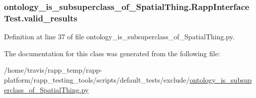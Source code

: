 \hypertarget{classontology__is__subsuperclass__of__SpatialThing_1_1RappInterfaceTest_a6643a11c2835d7d6e72acf58b9ead5f7}{
\subsubsection[{valid\-\_\-results}]{\setlength{\rightskip}{0pt plus 5cm}ontology\-\_\-is\-\_\-subsuperclass\-\_\-of\-\_\-\-Spatial\-Thing.\-Rapp\-Interface\-Test.\-valid\-\_\-results}}\label{classontology__is__subsuperclass__of__SpatialThing_1_1RappInterfaceTest_a6643a11c2835d7d6e72acf58b9ead5f7}


Definition at line 37 of file ontology\-\_\-is\-\_\-subsuperclass\-\_\-of\-\_\-\-Spatial\-Thing.\-py.



The documentation for this class was generated from the following file\-:\begin{DoxyCompactItemize}
\item 
/home/travis/rapp\-\_\-temp/rapp-\/platform/rapp\-\_\-testing\-\_\-tools/scripts/default\-\_\-tests/exclude/\hyperlink{ontology__is__subsuperclass__of__SpatialThing_8py}{ontology\-\_\-is\-\_\-subsuperclass\-\_\-of\-\_\-\-Spatial\-Thing.\-py}\end{DoxyCompactItemize}
